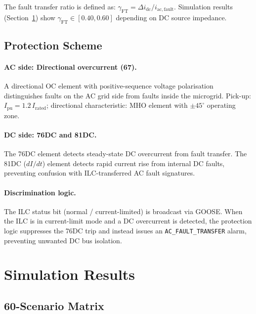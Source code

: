 \documentclass[11pt, a4paper]{article}
\begin{document}
The fault transfer ratio is defined as:
$\gamma_{\mathrm{FT}} = \Delta i_{\mathrm{dc}} / i_{\mathrm{ac,fault}}$.
Simulation results (Section~\ref{sec:results}) show
$\gamma_{\mathrm{FT}} \in [0.40, 0.60]$ depending on DC source impedance.

\subsection{Protection Scheme}

\paragraph{AC side: Directional overcurrent (67).}
A directional OC element with positive-sequence voltage polarisation
distinguishes faults on the AC grid side from faults inside the microgrid.
Pick-up: $I_{\mathrm{pu}} = 1.2\,I_{\mathrm{rated}}$; directional
characteristic: MHO element with $\pm 45^\circ$ operating zone.

\paragraph{DC side: 76DC and 81DC.}
The 76DC element detects steady-state DC overcurrent from fault transfer.
The 81DC ($dI/dt$) element detects rapid current rise from internal DC faults,
preventing confusion with ILC-transferred AC fault signatures.

\paragraph{Discrimination logic.}
The ILC status bit (normal / current-limited) is broadcast via GOOSE.
When the ILC is in current-limit mode and a DC overcurrent is detected,
the protection logic suppresses the 76DC trip and instead issues an
\texttt{AC\_FAULT\_TRANSFER} alarm, preventing unwanted DC bus isolation.

\section{Simulation Results}
\label{sec:results}

\subsection{60-Scenario Matrix}
\end{document}
